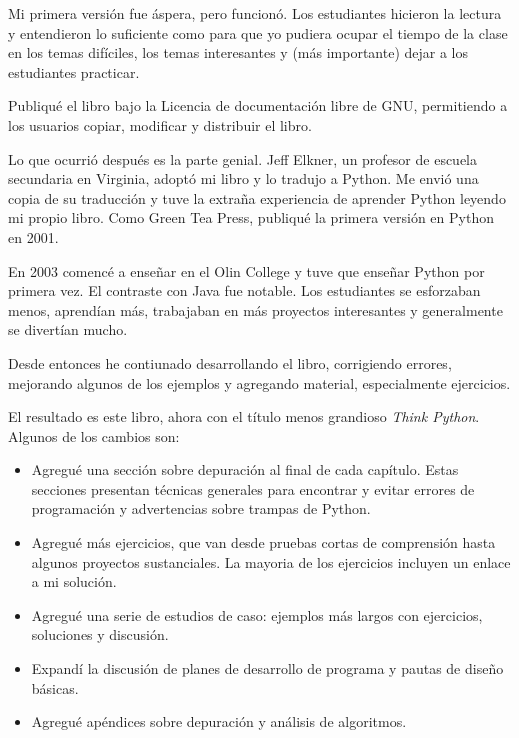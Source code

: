 \documentclass[10pt]{book}
\begin{document}
Mi primera versión fue áspera, pero funcionó.  Los estudiantes hicieron la
lectura y entendieron lo suficiente como para que yo pudiera ocupar el tiempo
de la clase en los temas difíciles, los temas interesantes y (más importante)
dejar a los estudiantes practicar.

Publiqué el libro bajo la Licencia de documentación libre de GNU,
permitiendo a los usuarios copiar, modificar y distribuir el libro.

Lo que ocurrió después es la parte genial.  Jeff Elkner, un profesor
de escuela secundaria en Virginia, adoptó mi libro y lo tradujo a Python.
Me envió una copia de su traducción y tuve la extraña experiencia de
aprender Python leyendo mi propio libro. Como Green Tea Press,
publiqué la primera versión en Python en 2001.

En 2003 comencé a enseñar en el Olin College y tuve que enseñar Python
por primera vez.  El contraste con Java fue notable.
Los estudiantes se esforzaban menos, aprendían más, trabajaban en más
proyectos interesantes y generalmente se divertían mucho.

Desde entonces he contiunado desarrollando el libro,
corrigiendo errores, mejorando algunos de los ejemplos y agregando material,
especialmente ejercicios.

El resultado es este libro, ahora con el título menos grandioso
{\em Think Python}.  Algunos de los cambios son:

\begin{itemize}

\item Agregué una sección sobre depuración al final de cada capítulo.
  Estas secciones presentan técnicas generales para encontrar y evitar
  errores de programación y advertencias sobre trampas de Python.

\item Agregué más ejercicios, que van desde pruebas cortas de comprensión
  hasta algunos proyectos sustanciales.  La mayoria de los ejercicios
  incluyen un enlace a mi solución.

\item Agregué una serie de estudios de caso: ejemplos más largos con
  ejercicios, soluciones y discusión.

\item Expandí la discusión de planes de desarrollo de programa y
  pautas de diseño básicas.

\item Agregué apéndices sobre depuración y análisis de algoritmos.

\end{itemize}
\end{document}
